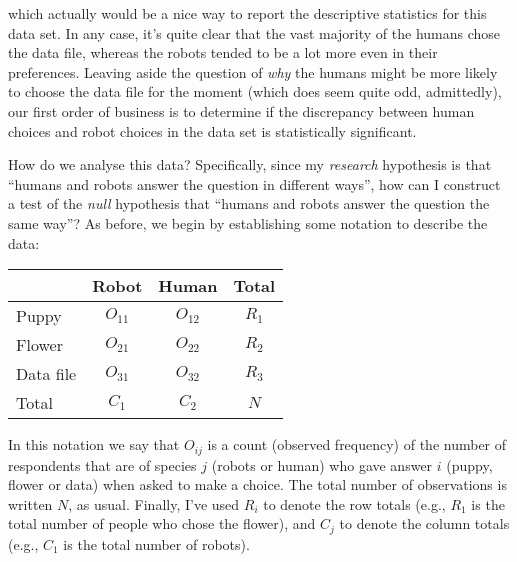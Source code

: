 which actually would be a nice way to report the descriptive statistics for this data set. In any case, it's quite clear that the vast majority of the humans chose the data file, whereas the robots tended to be a lot  more even in their preferences. Leaving aside the question of {\it why} the humans might be more likely to choose the data file for the moment (which does seem quite odd, admittedly), our first order of business is to determine if the discrepancy between human choices and robot choices in the data set is statistically significant.




How do we analyse this data? Specifically, since my {\it research} hypothesis is that ``humans and robots answer the question in different ways'', how can I construct a test of the {\it null} hypothesis that ``humans and robots answer the question the same way''? As before, we begin by establishing some notation to describe the data:
\begin{center}
\begin{tabular}{l|cc|c}
          & Robot & Human & Total \\ \hline
Puppy     & $O_{11}$  & $O_{12}$ & $R_{1}$ \\
Flower    & $O_{21}$ & $O_{22}$ & $R_{2}$ \\
Data file & $O_{31}$  & $O_{32}$ & $R_{3}$ \\ \hline
Total     & $C_{1}$ & $C_{2}$ & $N$
\end{tabular}
\end{center}

\noindent
In this notation we say that $O_{ij}$ is a count (observed frequency) of the number of respondents that are of species $j$ (robots or human) who gave answer $i$ (puppy, flower or data) when asked to make a choice. The total number of observations is written $N$, as usual. Finally, I've used $R_i$ to denote the row totals (e.g., $R_1$ is the total number of people who chose the flower), and $C_j$ to denote the column totals (e.g., $C_1$ is the total number of robots).

